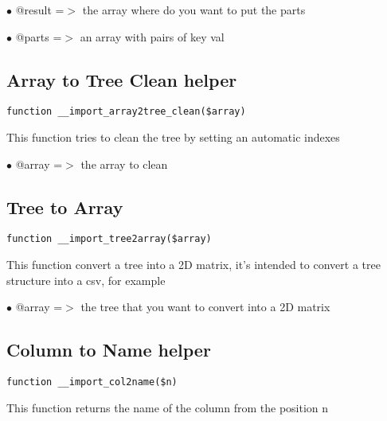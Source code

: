 \documentclass[a4paper]{book}
\begin{document}
\begin{compactitem}
\item[\color{myblue}$\bullet$] @result =$>$ the array where do you want to put the parts
\item[\color{myblue}$\bullet$] @parts  =$>$ an array with pairs of key val
\end{compactitem}

\hypertarget{toc163}{}
\subsection{Array to Tree Clean helper}

\begin{lstlisting}
function __import_array2tree_clean($array)
\end{lstlisting}

This function tries to clean the tree by setting an automatic indexes

\begin{compactitem}
\item[\color{myblue}$\bullet$] @array =$>$ the array to clean
\end{compactitem}

\hypertarget{toc164}{}
\subsection{Tree to Array}

\begin{lstlisting}
function __import_tree2array($array)
\end{lstlisting}

This function convert a tree into a 2D matrix, it's intended to convert
a tree structure into a csv, for example

\begin{compactitem}
\item[\color{myblue}$\bullet$] @array =$>$ the tree that you want to convert into a 2D matrix
\end{compactitem}

\hypertarget{toc165}{}
\subsection{Column to Name helper}

\begin{lstlisting}
function __import_col2name($n)
\end{lstlisting}

This function returns the name of the column from the position n
\end{document}

